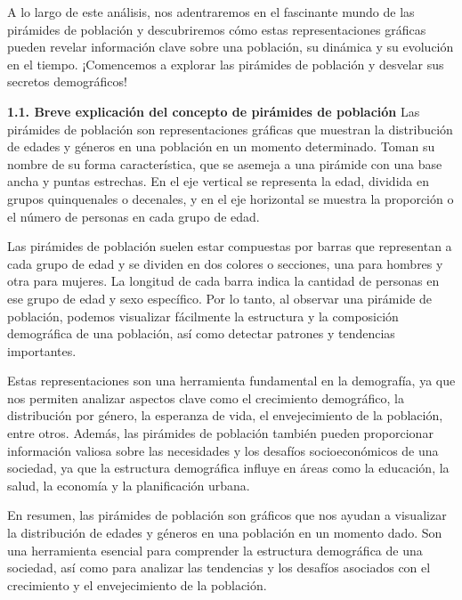\documentclass[8pt,a4paper]{beamer}
\begin{document}
{\begin{frame}{}
A lo largo de este análisis, nos adentraremos en el fascinante mundo de las pirámides de población y descubriremos cómo estas representaciones gráficas pueden revelar información clave sobre una población, su dinámica y su evolución en el tiempo. ¡Comencemos a explorar las pirámides de población y desvelar sus secretos demográficos!
\end{frame}

\begin{frame}{}
\begin{block}{\textbf{1.1. Breve explicación del concepto de pirámides de población}}
\setlength{\parskip}{3px}
\justifying
Las pirámides de población son representaciones gráficas que muestran la distribución de edades y géneros en una población en un momento determinado. Toman su nombre de su forma característica, que se asemeja a una pirámide con una base ancha y puntas estrechas. En el eje vertical se representa la edad, dividida en grupos quinquenales o decenales, y en el eje horizontal se muestra la proporción o el número de personas en cada grupo de edad.

Las pirámides de población suelen estar compuestas por barras que representan a cada grupo de edad y se dividen en dos colores o secciones, una para hombres y otra para mujeres. La longitud de cada barra indica la cantidad de personas en ese grupo de edad y sexo específico. Por lo tanto, al observar una pirámide de población, podemos visualizar fácilmente la estructura y la composición demográfica de una población, así como detectar patrones y tendencias importantes.

Estas representaciones son una herramienta fundamental en la demografía, ya que nos permiten analizar aspectos clave como el crecimiento demográfico, la distribución por género, la esperanza de vida, el envejecimiento de la población, entre otros. Además, las pirámides de población también pueden proporcionar información valiosa sobre las necesidades y los desafíos socioeconómicos de una sociedad, ya que la estructura demográfica influye en áreas como la educación, la salud, la economía y la planificación urbana.

\end{block}
\end{frame}

\begin{frame}{}
\begin{block}{}
\justifying
En resumen, las pirámides de población son gráficos que nos ayudan a visualizar la distribución de edades y géneros en una población en un momento dado. Son una herramienta esencial para comprender la estructura demográfica de una sociedad, así como para analizar las tendencias y los desafíos asociados con el crecimiento y el envejecimiento de la población.
\end{block}


\end{frame}}
\end{document}
